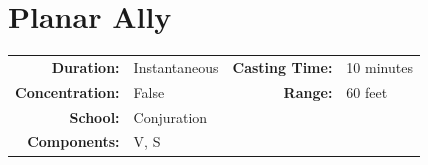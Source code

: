 \documentclass[12pt,showtrims]{memoir}
\begin{document}
\newpage
\section*{Planar Ally}

{
\small\centering\vspace{-6pt}
\begin{tabular}{rlrl}
\toprule

\textbf{Duration:} & Instantaneous &
\textbf{Casting Time:} & 10 minutes \\
\textbf{Concentration:} & False &
\textbf{Range:} & 60 feet \\
\textbf{School:} & Conjuration \\
\textbf{Components:} & \multicolumn{3}{p{0.7\textwidth}}{V, S}\\

\bottomrule
\end{tabular}
}
\end{document}
